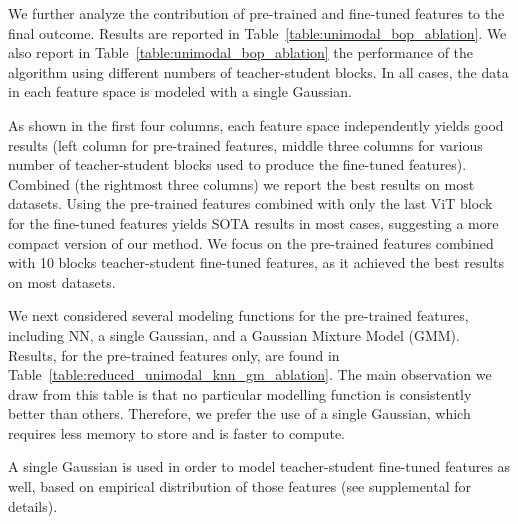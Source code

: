 \documentclass[10pt,twocolumn,letterpaper]{article}
\begin{document}
We further analyze the contribution of pre-trained and fine-tuned features to the final outcome. Results are reported in Table~\ref{table:unimodal_bop_ablation}. We also report in Table~\ref{table:unimodal_bop_ablation} the performance of the algorithm using different numbers of teacher-student  blocks. 
In all cases, the data in each feature space is modeled with a single Gaussian.

As shown in the first four columns, each feature space independently yields good results (left column for pre-trained features, middle three columns for various number of teacher-student blocks used to produce the fine-tuned features).
Combined (the rightmost three columns) we report the best results on most datasets. Using the pre-trained features combined with only the last ViT block for the fine-tuned features yields SOTA results in most cases, suggesting a more compact version of our method. We focus on the pre-trained features combined with 10 blocks teacher-student fine-tuned features, as it achieved the best results on most datasets.

We next considered several modeling functions for the pre-trained features, including NN, a single Gaussian, and a Gaussian Mixture Model (GMM). Results, for the pre-trained features only, are found in Table~\ref{table:reduced_unimodal_knn_gm_ablation}. The main observation we draw from this table is that no particular modelling function is consistently better than others. Therefore, we prefer the use of a single Gaussian, which requires less memory to store and is faster to compute.

A single Gaussian is used in order to model teacher-student fine-tuned features as well, based on empirical distribution of those features (see supplemental for details).
\end{document}
